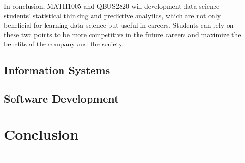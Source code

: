 \documentclass{article}
\begin{document}
In conclusion, MATH1005 and QBUS2820 will development data science students' statistical thinking and predictive analytics, which are not only beneficial for learning data science but useful in careers. Students can rely on these two points to be more competitive in the future careers and maximize the benefits of the company and the society.

\subsection{Information Systems}


\subsection{Software Development}

\section{Conclusion}




=======

{}

% 








\end{document}
